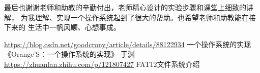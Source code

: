 \documentclass[12pt,a4paper,UTF8]{ctexart}
\begin{document}
最后也谢谢老师和助教的辛勤付出，老师精心设计的实验步骤和课堂上细致的讲解，
为我理解、实现一个操作系统起到了很大的帮助。也希望老师和助教能在接下来的
生活中一帆风顺、心想事成。

\begin{thebibliography}{1}
 \href{https://blog.csdn.net/goodcrony/article/details/88122934}
{https://blog.csdn.net/goodcrony/article/details/88122934}
一个操作系统的实现
 《Orange'S：一个操作系统的实现》 于渊
 \href{https://zhuanlan.zhihu.com/p/121807427}
{https://zhuanlan.zhihu.com/p/121807427}
FAT12文件系统介绍
\end{thebibliography}
\end{document}
